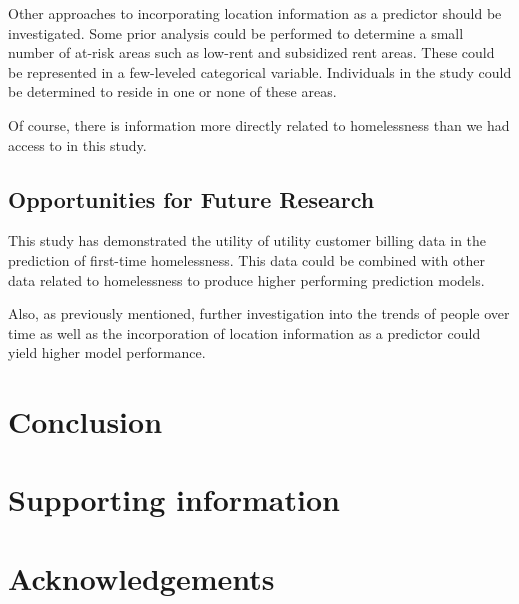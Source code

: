\documentclass[10pt,letterpaper]{article}
\newcommand{\red}[1]{{\color{red}{#1}}}
\begin{document}
Other approaches to incorporating location information as a predictor should be investigated. Some prior analysis could be performed to determine a small number of at-risk areas such as low-rent and subsidized rent areas. These could be represented in a few-leveled categorical variable. Individuals in the study could be determined to reside in one or none of these areas.

Of course, there is information more directly related to homelessness than we had access to in this study. \red{ADD useful information here}

\subsection*{Opportunities for Future Research}
This study has demonstrated the utility of utility customer billing data in the prediction of first-time homelessness. This data could be combined with other data related to homelessness to produce higher performing prediction models.

Also, as previously mentioned, further investigation into the trends of people over time as well as the incorporation of location information as a predictor could yield higher model performance.

\section*{Conclusion}

\section*{Supporting information}


\section*{Acknowledgements}

\nolinenumbers

%
%
% 




\end{document}
